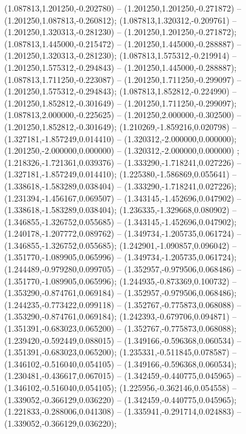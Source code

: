  (1.087813,1.201250,-0.202780) -- (1.201250,1.201250,-0.271872) -- (1.201250,1.087813,-0.260812);
 (1.087813,1.320312,-0.209761) -- (1.201250,1.320313,-0.281230) -- (1.201250,1.201250,-0.271872);
 (1.087813,1.445000,-0.215472) -- (1.201250,1.445000,-0.288887) -- (1.201250,1.320313,-0.281230);
 (1.087813,1.575312,-0.219914) -- (1.201250,1.575312,-0.294843) -- (1.201250,1.445000,-0.288887);
 (1.087813,1.711250,-0.223087) -- (1.201250,1.711250,-0.299097) -- (1.201250,1.575312,-0.294843);
 (1.087813,1.852812,-0.224990) -- (1.201250,1.852812,-0.301649) -- (1.201250,1.711250,-0.299097);
 (1.087813,2.000000,-0.225625) -- (1.201250,2.000000,-0.302500) -- (1.201250,1.852812,-0.301649);
 (1.210269,-1.859216,0.020798) -- (1.327181,-1.857249,0.014410) -- (1.320312,-2.000000,0.000000);
 (1.201250,-2.000000,0.000000) -- (1.320312,-2.000000,0.000000) ;
 (1.218326,-1.721361,0.039376) -- (1.333290,-1.718241,0.027226) -- (1.327181,-1.857249,0.014410);
 (1.225380,-1.586869,0.055641) -- (1.338618,-1.583289,0.038404) -- (1.333290,-1.718241,0.027226);
 (1.231394,-1.456167,0.069507) -- (1.343145,-1.452696,0.047902) -- (1.338618,-1.583289,0.038404);
 (1.236335,-1.329668,0.080902) -- (1.346855,-1.326752,0.055685) -- (1.343145,-1.452696,0.047902);
 (1.240178,-1.207772,0.089762) -- (1.349734,-1.205735,0.061724) -- (1.346855,-1.326752,0.055685);
 (1.242901,-1.090857,0.096042) -- (1.351770,-1.089905,0.065996) -- (1.349734,-1.205735,0.061724);
 (1.244489,-0.979280,0.099705) -- (1.352957,-0.979506,0.068486) -- (1.351770,-1.089905,0.065996);
 (1.244935,-0.873369,0.100732) -- (1.353290,-0.874761,0.069184) -- (1.352957,-0.979506,0.068486);
 (1.244235,-0.773422,0.099118) -- (1.352767,-0.775873,0.068088) -- (1.353290,-0.874761,0.069184);
 (1.242393,-0.679706,0.094871) -- (1.351391,-0.683023,0.065200) -- (1.352767,-0.775873,0.068088);
 (1.239420,-0.592449,0.088015) -- (1.349166,-0.596368,0.060534) -- (1.351391,-0.683023,0.065200);
 (1.235331,-0.511845,0.078587) -- (1.346102,-0.516040,0.054105) -- (1.349166,-0.596368,0.060534);
 (1.230481,-0.436617,0.067015) -- (1.342459,-0.440775,0.045965) -- (1.346102,-0.516040,0.054105);
 (1.225956,-0.362146,0.054558) -- (1.339052,-0.366129,0.036220) -- (1.342459,-0.440775,0.045965);
 (1.221833,-0.288006,0.041308) -- (1.335941,-0.291714,0.024883) -- (1.339052,-0.366129,0.036220);

